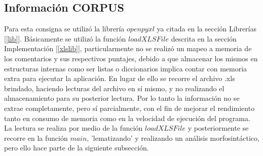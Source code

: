 \documentclass[12pt]{article}
\begin{document}
\subsection{Información CORPUS}
Para esta consigna se utilizó la librería $openpyxl$ ya citada en la sección Librerías [\ref{lib}]. Básicamente se utilizó la función $loadXLSFile$ descrita en la sección Implementación [\ref{xlslib}], particularmente no se realizó un mapeo a memoria de los comentarios y sus respectivos puntajes, debido a que almacenar los mismos en estructuras internas como ser listas o diccionarios implica contar con memoria extra para ejecutar la aplicación. En lugar de ello se recorre el archivo .xls brindado, haciendo lecturas del archivo en sí mismo, y no realizando el almacenamiento para su posterior lectura. Por lo tanto la información no se extrae completamente, pero sí parcialmente, con el fin de mejorar el rendimiento tanto en consumo de memoria como en la velocidad de ejecución del programa.
La lectura se realiza por medio de la función $loadXLSFile$ y posteriormente se recorre en la función $main$, 'lematizando' y realizando un análisis morfosintáctico, pero ello hace parte de la siguiente subsección.
\end{document}
